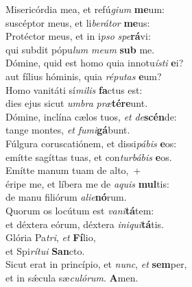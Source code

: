 \evenverse Misericórdia mea, et refú\textit{gi}\textit{um} \textbf{me}um:~\*\\
\evenverse suscéptor meus, et li\textit{be}\textit{rá}\textit{tor} \textbf{me}us:\\
\oddverse Protéctor meus, et in i\textit{pso} \textit{spe}\textbf{rá}vi:~\*\\
\oddverse qui subdit pópu\textit{lum} \textit{me}\textit{um} \textbf{sub} me.\\
\evenverse Dómine, quid est homo quia innotu\textit{í}\textit{sti} \textbf{e}i?~\*\\
\evenverse aut fílius hóminis, quia \textit{ré}\textit{pu}\textit{tas} \textbf{e}um?\\
\oddverse Homo vanitáti sí\textit{mi}\textit{lis} \textbf{fa}ctus est:~\*\\
\oddverse dies ejus sicut \textit{um}\textit{bra} \textit{præ}\textbf{té}\textbf{re}unt.\\
\evenverse Dómine, inclína cælos tuos, \textit{et} \textit{de}\textbf{scén}de:~\*\\
\evenverse tange montes, \textit{et} \textit{fu}\textit{mi}\textbf{gá}bunt.\\
\oddverse Fúlgura coruscatiónem, et dissi\textit{pá}\textit{bis} \textbf{e}os:~\*\\
\oddverse emítte sagíttas tuas, et con\textit{tur}\textit{bá}\textit{bis} \textbf{e}os.\\
\evenverse Emítte manum tuam de alto,~+\\
\evenverse  éripe me, et líbera me de \textit{a}\textit{quis} \textbf{mul}tis:~\*\\
\evenverse de manu filiórum \textit{a}\textit{li}\textit{e}\textbf{nó}rum.\\
\oddverse Quorum os locútum est \textit{va}\textit{ni}\textbf{tá}tem:~\*\\
\oddverse et déxtera eórum, déxtera \textit{i}\textit{ni}\textit{qui}\textbf{tá}tis.\\
\evenverse Glória Pa\textit{tri}, \textit{et} \textbf{Fí}lio,~\*\\
\evenverse et Spi\textit{rí}\textit{tu}\textit{i} \textbf{San}cto.\\
\oddverse Sicut erat in princípio, et \textit{nunc}, \textit{et} \textbf{sem}per,~\*\\
\oddverse et in sǽcula sæ\textit{cu}\textit{ló}\textit{rum}. \textbf{A}men.\\
